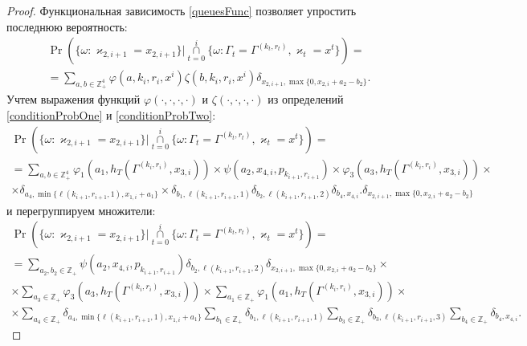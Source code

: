 \begin{proof}
Функциональная зависимость \eqref{queuesFunc} позволяет упростить последнюю вероятность:
\begin{multline*}
\Pr (\{ \omega \colon \varkappa_{2,  i+1} = x_{2,  i+1}\} |\mathop{\cap}\limits_{t=0}^{i}\{\omega\colon \Gamma_t=\Gamma^{(k_t,  r_t)},   \varkappa_t=x^t\}) =\\
=\sum_{a,  b\in \mathbb{Z}_+^4} \varphi(a,  k_i,  r_i,  x^i)\zeta(b,  k_i,  r_i,  x^i)  \delta_{x_{2,  i+1},  \max\{0,  x_{2,  i}+a_2-b_2\}}.
\end{multline*}
Учтем выражения функций $\varphi(\cdot,   \cdot,   \cdot,   \cdot)$ и $\zeta(\cdot,   \cdot,  \cdot,  \cdot)$ из определений \eqref{conditionProbOne} и \eqref{conditionProbTwo}:
\begin{multline*}
\Pr (\{ \omega \colon \varkappa_{2,  i+1} = x_{2,  i+1}\} |\mathop{\cap}\limits_{t=0}^{i}\{\omega\colon \Gamma_t=\Gamma^{(k_t,  r_t)},   \varkappa_t=x^t\}) =\\
=  \sum_{a,  b\in \mathbb{Z}_+^4} \varphi_1(a_1,  h_T(\Gamma^{(k_i,  r_i)},  x_{3,  i})) \times \psi(a_2,  x_{4,  i},   p_{k_{i+1},  r_{i+1}})  \times \varphi_3(a_3,  h_T(\Gamma^{(k_i,  r_i)},  x_{3,  i})) \times \\ \times \delta_{a_4,  \min{\{\ell(k_{i+1},  r_{i+1},  1),   x_{1,  i}+a_1}\}} \times \delta_{b_1,  \ell(k_{i+1},  r_{i+1},  1)} \delta_{b_2,  \ell(k_{i+1},  r_{i+1},  2)} 
\delta_{b_4,  x_{4,  i}}. \delta_{x_{2,  i+1},  \max\{0,  x_{2,  i}+a_2-b_2\}} 
\end{multline*}
и перегруппируем множители:
\begin{multline*}
\Pr (\{ \omega \colon \varkappa_{2,  i+1} = x_{2,  i+1}\} |\mathop{\cap}\limits_{t=0}^{i}\{\omega\colon \Gamma_t=\Gamma^{(k_t,  r_t)},   \varkappa_t=x^t\}) =\\
= \sum_{a_2,  b_2\in \mathbb{Z}_+}\psi(a_2,  x_{4,  i},   p_{k_{i+1},  r_{i+1}})  \delta_{b_2,  \ell(k_{i+1},  r_{i+1},  2)}   \delta_{x_{2,  i+1},  \max\{0,  x_{2,  i}+a_2-b_2\}} \times \\ 
\times \sum_{a_3\in \mathbb{Z}_+} \varphi_3(a_3,  h_T(\Gamma^{(k_i,  r_i)},  x_{3,  i})) \times \sum_{a_1\in \mathbb{Z}_+} \varphi_1(a_1,  h_T(\Gamma^{(k_i,  r_i)},  x_{3,  i})) \times \\ 
\times \sum_{a_4\in \mathbb{Z}_+} \delta_{a_4,  \min{\{\ell(k_{i+1},  r_{i+1},  1),   x_{1,  i}+a_1}\}} \sum_{b_1\in \mathbb{Z}_+} \delta_{b_1,  \ell(k_{i+1},  r_{i+1},  1)} \sum_{b_3\in \mathbb{Z}_+} \delta_{b_3,  \ell(k_{i+1},  r_{i+1},  3)} 
 \sum_{b_4\in \mathbb{Z}_+}  \delta_{b_4,  x_{4,  i}}.
\end{multline*}

\end{proof}
